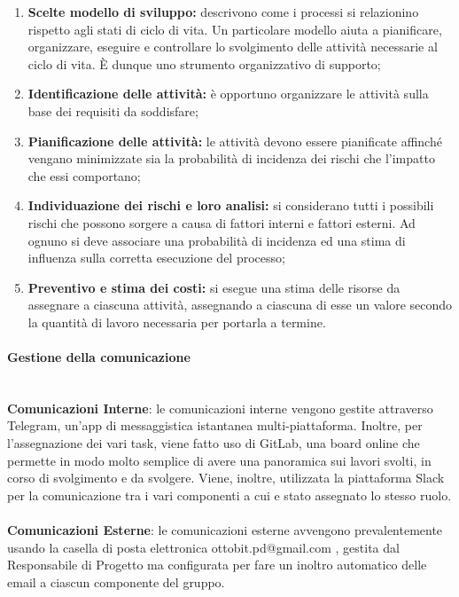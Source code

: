 \documentclass[11pt,a4paper]{article}
\begin{document}
{	\begin{enumerate}
		\item \textbf{Scelte modello di sviluppo:} descrivono come i processi si relazionino rispetto agli stati di ciclo di vita. Un particolare modello aiuta a pianificare, organizzare, eseguire e controllare lo svolgimento delle attività necessarie al ciclo di vita. È dunque uno strumento organizzativo di supporto;
		\item \textbf{Identificazione delle attività:} è opportuno organizzare le attività sulla base dei requisiti da soddisfare;
		\item \textbf{Pianificazione delle attività:} le attività devono essere pianificate affinché vengano minimizzate sia la probabilità di incidenza dei rischi che l'impatto che essi comportano;
		\item \textbf{Individuazione dei rischi e loro analisi:} si considerano tutti i possibili rischi che possono sorgere a causa di fattori interni e fattori esterni. Ad ognuno si deve associare una probabilità di incidenza ed una stima di influenza sulla corretta esecuzione del processo;
		\item \textbf{Preventivo e stima dei costi:} si esegue una stima delle risorse da assegnare a ciascuna attività, assegnando a ciascuna di esse un valore secondo la quantità di lavoro necessaria per portarla a termine.
	\end{enumerate}

\paragraph{Gestione della comunicazione\\}
\noindent\\
\textbf{Comunicazioni Interne}: le comunicazioni interne vengono gestite attraverso Telegram, un'app di messaggistica
istantanea multi-piattaforma. Inoltre, per l'assegnazione dei vari task, viene fatto uso di GitLab, una board online
che permette in modo molto semplice di avere una panoramica sui lavori svolti, in corso di svolgimento e da svolgere.
Viene, inoltre, utilizzata la piattaforma Slack per la comunicazione tra i vari componenti a cui e stato assegnato
lo stesso ruolo.\noindent\\\\
\textbf{Comunicazioni Esterne}: le comunicazioni esterne avvengono prevalentemente usando la casella di posta
elettronica ottobit.pd@gmail.com , gestita dal Responsabile di Progetto ma configurata per fare un inoltro automatico delle email a ciascun componente del gruppo.

}
\end{document}

